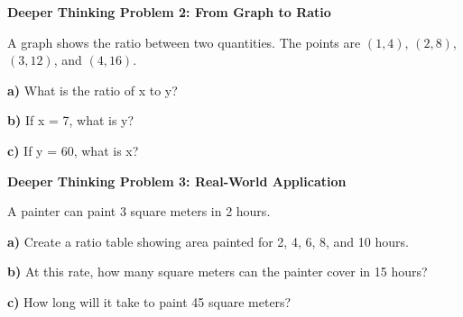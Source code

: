 \documentclass[12pt, letterpaper, fleqn]{article}
\begin{document}
\begin{tcolorbox}[colback=yellow!15, colframe=orange, boxrule=1.5pt, arc=4mm, left=6mm, right=6mm, top=5mm, bottom=5mm]

\textbf{Deeper Thinking Problem 2: From Graph to Ratio}

\medskip

\noindent
A graph shows the ratio between two quantities. The points are $(1,4)$, $(2,8)$, $(3,12)$, and $(4,16)$.

\noindent
\textbf{a)} What is the ratio of x to y?

\vspace{1.5cm}

\noindent
\textbf{b)} If x = 7, what is y?

\vspace{1.5cm}

\noindent
\textbf{c)} If y = 60, what is x?

\vspace{1.8cm}

\end{tcolorbox}

\newpage

\begin{tcolorbox}[colback=yellow!15, colframe=orange, boxrule=1.5pt, arc=4mm, left=6mm, right=6mm, top=5mm, bottom=5mm]

\textbf{Deeper Thinking Problem 3: Real-World Application}

\medskip

\noindent
A painter can paint 3 square meters in 2 hours.

\noindent
\textbf{a)} Create a ratio table showing area painted for 2, 4, 6, 8, and 10 hours.

\vspace{2.5cm}

\noindent
\textbf{b)} At this rate, how many square meters can the painter cover in 15 hours?

\vspace{1.5cm}

\noindent
\textbf{c)} How long will it take to paint 45 square meters?

\vspace{1.8cm}

\end{tcolorbox}
\end{document}
